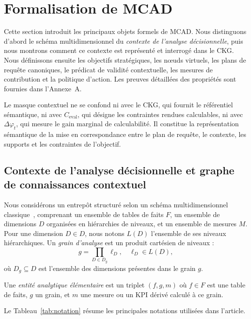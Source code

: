 \documentclass[journal]{IEEEtran}
\begin{document}
\section{Formalisation de MCAD}
\label{sec:formal}

Cette section introduit les principaux objets formels de MCAD. Nous distinguons d'abord le schéma multidimensionnel du \emph{contexte de l'analyse décisionnelle}, puis nous montrons comment ce contexte est représenté et interrogé dans le CKG. Nous définissons ensuite les objectifs stratégiques, les nœuds virtuels, les plans de requête canoniques, le prédicat de validité contextuelle, les mesures de contribution et la politique d'action. Les preuves détaillées des propriétés sont fournies dans l'Annexe~A.

Le masque contextuel ne se confond ni avec le CKG, qui fournit le référentiel sémantique, ni avec $C_{\mathrm{eval}}$, qui désigne les contraintes rendues calculables, ni avec $\Delta\varphi_t$, qui mesure le gain marginal de calculabilité. Il constitue la représentation sémantique de la mise en correspondance entre le plan de requête, le contexte, les supports et les contraintes de l'objectif.

\subsection{Contexte de l'analyse décisionnelle et graphe de connaissances contextuel}

Nous considérons un entrepôt structuré selon un schéma multidimensionnel classique~\cite{ChaudhuriDayal97,KimballRoss2013}, comprenant un ensemble de tables de faits $F$, un ensemble de dimensions $D$ organisées en hiérarchies de niveaux, et un ensemble de mesures $M$. Pour une dimension $D\in D$, nous notons $L(D)$ l'ensemble de ses niveaux hiérarchiques. Un \emph{grain d'analyse} est un produit cartésien de niveaux :
\[
g = \prod_{D\in D_g} \ell_D,\quad \ell_D\in L(D),
\]
où $D_g\subseteq D$ est l'ensemble des dimensions présentes dans le grain $g$.

Une \emph{entité analytique élémentaire} est un triplet $(f,g,m)$ où $f\in F$ est une table de faits, $g$ un grain, et $m$ une mesure ou un KPI dérivé calculé à ce grain.

Le Tableau~\ref{tab:notation} résume les principales notations utilisées dans l'article.


\end{document}

